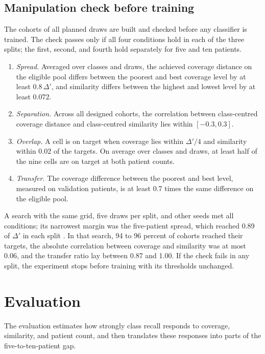 \documentclass[11pt]{article}
\begin{document}
\subsection{Manipulation check before training}
\label{sec:check}
The cohorts of all planned draws are built and checked before any classifier is trained. The check passes only if all four conditions hold in each of the three splits; the first, second, and fourth hold separately for five and ten patients.
\begin{enumerate}
 \item \emph{Spread.} Averaged over classes and draws, the achieved coverage distance on the eligible pool differs between the poorest and best coverage level by at least $0.8\,\Delta'$, and similarity differs between the highest and lowest level by at least 0.072.
 \item \emph{Separation.} Across all designed cohorts, the correlation between class-centred coverage distance and class-centred similarity lies within $[-0.3,0.3]$.
 \item \emph{Overlap.} A cell is on target when coverage lies within $\Delta'/4$ and similarity within 0.02 of the targets. On average over classes and draws, at least half of the nine cells are on target at both patient counts.
 \item \emph{Transfer.} The coverage difference between the poorest and best level, measured on validation patients, is at least 0.7 times the same difference on the eligible pool.
\end{enumerate}
\noindent A search with the same grid, five draws per split, and other seeds met all conditions; its narrowest margin was the five-patient spread, which reached 0.89 of $\Delta'$ in each split \citep{queisler2026coverageSimilarity}. In that search, 94 to 96 percent of cohorts reached their targets, the absolute correlation between coverage and similarity was at most 0.06, and the transfer ratio lay between 0.87 and 1.00. If the check fails in any split, the experiment stops before training with its thresholds unchanged.

\section{Evaluation}
\label{sec:evaluation}
The evaluation estimates how strongly class recall responds to coverage, similarity, and patient count, and then translates these responses into parts of the five-to-ten-patient gap.
\end{document}
